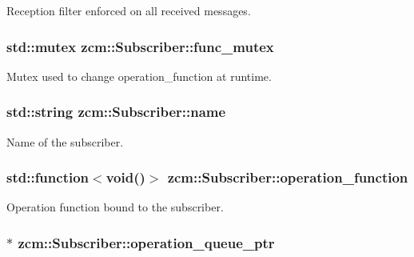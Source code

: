 Reception filter enforced on all received messages. 

\hypertarget{classzcm_1_1Subscriber_abd7e5c8f6ab6ce6e8854d8d407476c25}{
\subsubsection[{func\-\_\-mutex}]{\setlength{\rightskip}{0pt plus 5cm}std\-::mutex zcm\-::\-Subscriber\-::func\-\_\-mutex\hspace{0.3cm}{\ttfamily [private]}}}\label{classzcm_1_1Subscriber_abd7e5c8f6ab6ce6e8854d8d407476c25}


Mutex used to change operation\-\_\-function at runtime. 

\hypertarget{classzcm_1_1Subscriber_a2ec3b22204d0f3f72e996b19b086910b}{
\subsubsection[{name}]{\setlength{\rightskip}{0pt plus 5cm}std\-::string zcm\-::\-Subscriber\-::name\hspace{0.3cm}{\ttfamily [private]}}}\label{classzcm_1_1Subscriber_a2ec3b22204d0f3f72e996b19b086910b}


Name of the subscriber. 

\hypertarget{classzcm_1_1Subscriber_ab8e52c24d7dc57b33d2c1536de4197b2}{
\subsubsection[{operation\-\_\-function}]{\setlength{\rightskip}{0pt plus 5cm}std\-::function$<$void()$>$ zcm\-::\-Subscriber\-::operation\-\_\-function\hspace{0.3cm}{\ttfamily [private]}}}\label{classzcm_1_1Subscriber_ab8e52c24d7dc57b33d2c1536de4197b2}


Operation function bound to the subscriber. 

\hypertarget{classzcm_1_1Subscriber_a1cd579aa570832f9656b9fa24747dde3}{
\subsubsection[{operation\-\_\-queue\-\_\-ptr}]{$\ast$ zcm\-::\-Subscriber\-::operation\-\_\-queue\-\_\-ptr\hspace{0.3cm}{\ttfamily [private]}}}\label{classzcm_1_1Subscriber_a1cd579aa570832f9656b9fa24747dde3}


